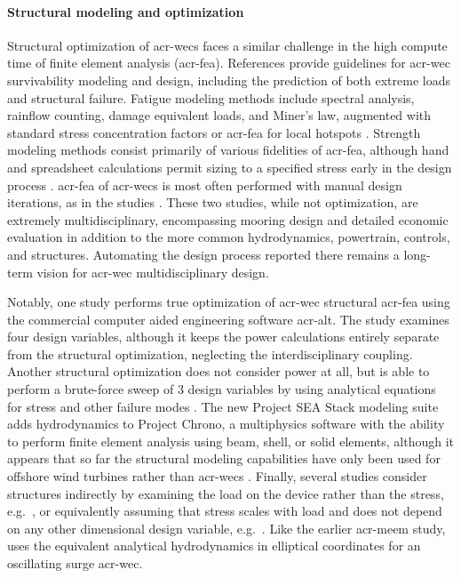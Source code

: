     \paragraph{Structural modeling and optimization}
    Structural optimization of \glspl{acr-wec} faces a similar challenge in the high compute time of finite element analysis (\gls{acr-fea}).
    References \citep{coe_survey_2018, ove_arup__partners_ltd_structural_2016,paduano_towards_2024,giannini_wave_2022} provide guidelines for \gls{acr-wec} survivability modeling and design, including the prediction of both extreme loads and structural failure.
    Fatigue modeling methods include spectral analysis, rainflow counting, damage equivalent loads, and Miner's law, augmented with standard stress concentration factors or \gls{acr-fea} for local hotspots \citep{ove_arup__partners_ltd_structural_2016}.
    Strength modeling methods consist primarily of various fidelities of \gls{acr-fea}, although hand and spreadsheet calculations permit sizing to a specified stress early in the design process \citep{ove_arup__partners_ltd_structural_2016}.
    \gls{acr-fea} of \glspl{acr-wec} is most often performed with manual design iterations, as in the studies \citep{RM3,mi_multi-scale_2025}.
    These two studies, while not optimization, are extremely multidisciplinary, encompassing mooring design and detailed economic evaluation in addition to the more common hydrodynamics, powertrain, controls, and structures.
    Automating the design process reported there remains a long-term vision for \gls{acr-wec} multidisciplinary design.

    Notably, one study \citep{an_optimal_2024} performs true optimization of \gls{acr-wec} structural \gls{acr-fea} using the commercial computer aided engineering software \gls{acr-alt}.
    The study examines four design variables, although it keeps the power calculations entirely separate from the structural optimization, neglecting the interdisciplinary coupling.
    Another structural optimization does not consider power at all, but is able to perform a brute-force sweep of 3 design variables by using analytical equations for stress and other failure modes \citep{ambuhl_reliability-based_2014}.
    The new Project SEA Stack modeling suite adds hydrodynamics to Project Chrono, a multiphysics software with the ability to perform finite element analysis using beam, shell, or solid elements, although it appears that so far the structural modeling capabilities have only been used for offshore wind turbines rather than \glspl{acr-wec} \citep{ogden_hydrochrono_2023}.
    Finally, several studies consider structures indirectly by examining the load on the device rather than the stress, e.g.\ \citep{nguyen_theoretical_2024, ferri_balancing_2014}, or equivalently assuming that stress scales with load and does not depend on any other dimensional design variable, e.g.\ \citep{garcia-teruel_reliability-based_2021, cotten_multi-objective_2022}.
    Like the earlier \gls{acr-meem} study, \citet{nguyen_theoretical_2024} uses the equivalent analytical hydrodynamics in elliptical coordinates for an oscillating surge \gls{acr-wec}.

